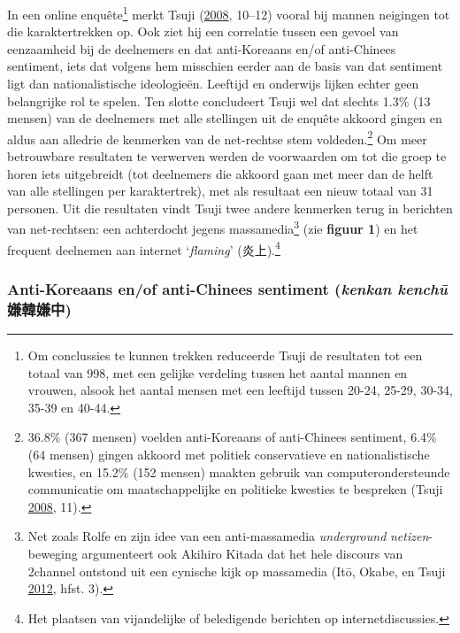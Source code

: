\documentclass[10.5pt,dutch,]{article}
\begin{document}
In een online enquête\footnote{Om conclussies te kunnen trekken
  reduceerde Tsuji de resultaten tot een totaal van 998, met een gelijke
  verdeling tussen het aantal mannen en vrouwen, alsook het aantal
  mensen met een leeftijd tussen 20-24, 25-29, 30-34, 35-39 en 40-44.}
merkt Tsuji (\protect\hyperlink{ref-tsujiux5fintanettoux5f2008}{2008},
10--12) vooral bij mannen neigingen tot die karaktertrekken op. Ook ziet
hij een correlatie tussen een gevoel van eenzaamheid bij de deelnemers
en dat anti-Koreaans en/of anti-Chinees sentiment, iets dat volgens hem
misschien eerder aan de basis van dat sentiment ligt dan
nationalistische ideologieën. Leeftijd en onderwijs lijken echter geen
belangrijke rol te spelen. Ten slotte concludeert Tsuji wel dat slechts
1.3\% (13 mensen) van de deelnemers met alle stellingen uit de enquête
akkoord gingen en aldus aan alledrie de kenmerken van de net-rechtse
stem voldeden.\footnote{36.8\% (367 mensen) voelden anti-Koreaans of
  anti-Chinees sentiment, 6.4\% (64 mensen) gingen akkoord met politiek
  conservatieve en nationalistische kwesties, en 15.2\% (152 mensen)
  maakten gebruik van computerondersteunde communicatie om
  maatschappelijke en politieke kwesties te bespreken (Tsuji
  \protect\hyperlink{ref-tsujiux5fintanettoux5f2008}{2008}, 11).} Om
meer betrouwbare resultaten te verwerven werden de voorwaarden om tot
die groep te horen iets uitgebreidt (tot deelnemers die akkoord gaan met
meer dan de helft van alle stellingen per karaktertrek), met als
resultaat een nieuw totaal van 31 personen. Uit die resultaten vindt
Tsuji twee andere kenmerken terug in berichten van net-rechtsen: een
achterdocht jegens massamedia\footnote{Net zoals Rolfe en zijn idee van
  een anti-massamedia \emph{underground} \emph{netizen}-beweging
  argumenteert ook Akihiro Kitada dat het hele discours van 2channel
  ontstond uit een cynische kijk op massamedia (Itō, Okabe, en Tsuji
  \protect\hyperlink{ref-itoux5ffandomux5f2012}{2012}, hfst. 3).} (zie
\textbf{figuur 1}) en het frequent deelnemen aan internet
`\emph{flaming}' (炎上).\footnote{Het plaatsen van vijandelijke of
  beledigende berichten op internetdiscussies.}

\subsubsection{\texorpdfstring{Anti-Koreaans en/of anti-Chinees
sentiment (\emph{kenkan kenchū}
嫌韓嫌中)}{Anti-Koreaans en/of anti-Chinees sentiment (kenkan kenchū 嫌韓嫌中)}}\label{anti-koreaans-enof-anti-chinees-sentiment-kenkan-kenchux16b-ux5accux97d3ux5accux4e2d}
\end{document}
